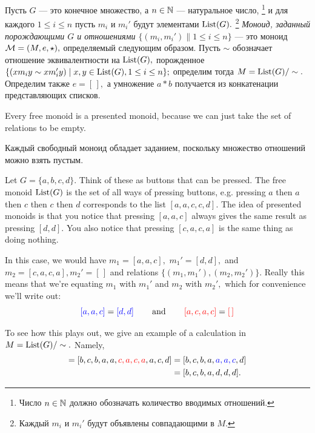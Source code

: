 \documentclass[../main/CT4S-EN-RU]{subfiles}
\begin{document}
\begin{definitionRUS}\label{def:presented monoid}
Пусть $G$ — это конечное множество, а $n\in{\mathbb N}$ — натуральное число,%
\footnote{Число $n\in{\mathbb N}$ должно обозначать количество вводимых отношений.}
и для каждого $1\leq i\leq n$ пусть $m_i$ и $m_i'$ будут элементами $\operatorname{List}(G).$%
\footnote{Каждый $m_i$ и $m_i'$ будут объявлены совпадающими в $M.$}
{\em Моноид, заданный порождающими $G$ и отношениями $\{(m_i,m_i')\|1\leq i\leq n\}$} — это моноид $\mathcal{M}=(M,e,\star),$ определяемый следующим образом. Пусть $\sim$ обозначает отношение эквивалентности на $\operatorname{List}(G),$ порожденное $\{(xm_iy\sim xm_i'y){\;|\;}x,y\in\operatorname{List}(G), 1\leq i\leq n\};$ определим тогда $M=\operatorname{List}(G)/\sim.$ Определим также $e=[\,],$ а умножение $a * b$ получается из конкатенации представляющих списков. 
\end{definitionRUS}

\begin{remarkENG}
Every free monoid is a presented monoid, because we can just take the set of relations to be empty.
\end{remarkENG}

\begin{remarkRUS}
Каждый свободный моноид обладает заданием, поскольку множество отношений можно взять пустым.
\end{remarkRUS}

\begin{exampleENG}\label{ex:presented monoid}
Let $G=\{a,b,c,d\}.$ Think of these as buttons that can be pressed. The free monoid $\operatorname{List}(G)$ is the set of all ways of pressing buttons, e.g. pressing $a$ then $a$ then $c$ then $c$ then $d$ corresponds to the list $[a,a,c,c,d].$ The idea of presented monoids is that you notice that pressing $[a,a,c]$ always gives the same result as pressing $[d,d].$ You also notice that pressing $[c,a,c,a]$ is the same thing as doing nothing.

In this case, we would have $m_1=[a,a,c],$ $m_1'=[d,d],$ and $m_2=[c,a,c,a], m_2'=[\,]$ and relations $\{(m_1,m_1'), (m_2,m_2')\}.$ Really this means that we're equating $m_1$ with $m_1'$ and $m_2$ with $m_2',$ which for convenience we'll write out:
$${\color{blue}{[a,a,c]}}={\color{blue}{[d,d]}}\hspace{.3in}\textnormal{and}\hspace{.3in}{\color{red}{[a,c,a,c]}}={\color{red}{[\,]}}
$$

To see how this plays out, we give an example of a calculation in $M=\operatorname{List}(G)/\sim.$ Namely,
\begin{align*}
[b,c,b,{\color{blue}{d,d}},a,c,a,a,c,d] = [b,c,b,a,a,{\color{red}{c,a,c,a}},a,c,d] &= [b,c,b,a,{\color{blue}{a,a,c}},d]\\
&= [b,c,b,a,d,d,d].
\end{align*}
\end{exampleENG}
\end{document}
